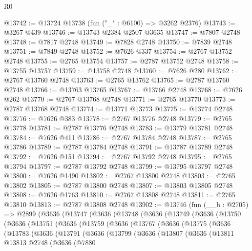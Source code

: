 \begin{lexlean}{R0}
\begin{coremodule}
@13742 := @13724 @13738 (fun ("_" : @6100) => @3262 @2376)
@13743 := @3267 @439
@13746 := @13743 @2384 @2507 @3635
@13747 := @7807 @2748
@13748 := @7817 @2748
@13749 := @7828 @2748
@13750 := @7839 @2748
@13751 := @7849 @2748
@13752 := @7626 @337
@13754 := @2767 @13752 @2748
@13755 := @2765 @13754
@13757 := @2787 @13752 @2748
@13758 := @13755 @13757
@13759 := @13758 @2748
@13760 := @7626 @280
@13762 := @2767 @13760 @2748
@13763 := @2765 @13762
@13765 := @2787 @13760 @2748
@13766 := @13763 @13765
@13767 := @13766 @2748
@13768 := @7626 @262
@13770 := @2767 @13768 @2748
@13771 := @2765 @13770
@13773 := @2787 @13768 @2748
@13774 := @13771 @13773
@13775 := @13774 @2748
@13776 := @7626 @383
@13778 := @2767 @13776 @2748
@13779 := @2765 @13778
@13781 := @2787 @13776 @2748
@13783 := @13779 @13781 @2748
@13784 := @7626 @411
@13786 := @2767 @13784 @2748
@13787 := @2765 @13786
@13789 := @2787 @13784 @2748
@13791 := @13787 @13789 @2748
@13792 := @7626 @151
@13794 := @2767 @13792 @2748
@13795 := @2765 @13794
@13797 := @2787 @13792 @2748
@13799 := @13795 @13797 @2748
@13800 := @7626 @1490
@13802 := @2767 @13800 @2748
@13803 := @2765 @13802
@13805 := @2787 @13800 @2748
@13807 := @13803 @13805 @2748
@13808 := @7626 @1763
@13810 := @2767 @13808 @2748
@13811 := @2765 @13810
@13813 := @2787 @13808 @2748
@13902 := @13746
    (fun (__b : @2705) =>
    @2899
      (@3636
        (@13747
          (@3636
            (@13748
              (@3636
                (@13749
                  (@3636
                    (@13750
                      (@3636
                        (@13751
                          (@3636
                            (@13759
                              (@3636
                                (@13767
                                  (@3636
                                    (@13775
                                      (@3636
                                        (@13783
                                          (@3636
                                            (@13791
                                              (@3636
                                                (@13799
                                                  (@3636
                                                    (@13807
                                                      (@3636
                                                        (@13811
                                                          @13813
                                                          @2748
                                                          (@3636
                                                            (@7880

\end{coremodule}
\end{lexlean}
